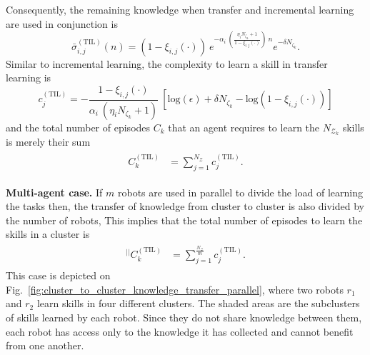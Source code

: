 Consequently, the remaining knowledge when transfer and incremental learning are used in conjunction is
\begin{equation}\label{eq:remaining_knowledge__ITL}
	\bar{\sigma}^{(\text{TIL})}_{i,j}(n) = \left(1- \xi_{i,j}(\cdot) \right)\: e^{-\alpha_i \: \left(\frac{ \eta_i N_{\zeta_k}+1}{1 - \xi_{i,j}(\cdot)}\right) \:n} e^{-\delta N_{\zeta_k}}.
\end{equation}
Similar to incremental learning, the complexity to learn a skill in transfer learning is
\begin{equation}\label{eq:skill_complexity_TL}
	c^{(\text{TIL})}_{j} = -\frac{1 - \xi_{i,j}(\cdot)}{\alpha_i\: (\eta_i N_{\zeta_k}+ 1)}\:\left[\text{log}(\epsilon) + \delta N_{\zeta_k} - \text{log}(1 - \xi_{i,j}(\cdot))\right]
\end{equation}
and the total number of episodes  $ C_k $ that an agent requires to learn the $N_{\mathcal{Z}_k}$ skills is merely their sum
\begin{align}\label{eq:total_episodes_transfer}
	\begin{split}
		C^{(\text{TIL})}_k &= \sum^{N_{\mathcal{Z}}}_{j=1} c^{(\text{TIL})}_{j}.
	\end{split}
\end{align}

\textbf{Multi-agent case.} If $m$ robots are used in parallel to divide the load of learning the tasks then, the transfer of knowledge from cluster to cluster is also divided by the number of robots, This implies that the total number of episodes to learn the skills in a cluster is
\begin{align}
	\begin{split}
		{}^{\lvert \rvert}C^{(\text{TIL})}_k &= \sum^{\frac{N_{\mathcal{Z}}}{m}}_{j=1} c^{(\text{TIL})}_{j}.
	\end{split}
\end{align}
This case is depicted on Fig.~\ref{fig:cluster_to_cluster_knowledge_transfer_parallel}, where two robots $ r_1$ and $r_2$ learn skills in four different clusters. The shaded areas are the subclusters of skills learned by each robot. Since they do not share knowledge between them, each robot has access only to the knowledge it has collected and cannot benefit from one another. 

